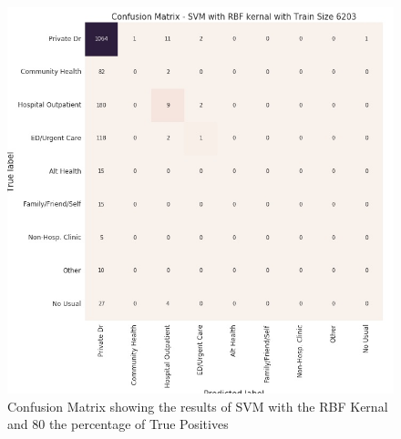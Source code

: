 \documentclass[10pt,twocolumn]{article}
\begin{document}
\begin{figure}[!t]
  \begin{center}
    \includegraphics[width=6in]{confusion_matrix_RBF_CW1_6203.jpg}
  \end{center}

  \caption{\small Confusion Matrix showing the results of SVM with the RBF Kernal and
  80%
  the percentage of True Positives}
  \label{fig-3}
\end{figure}
\end{document}
